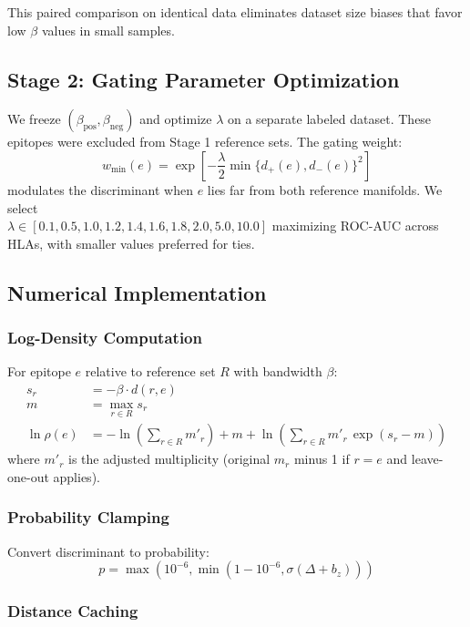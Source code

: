 \documentclass[11pt]{article}
\begin{document}
This paired comparison on identical data eliminates dataset size biases that favor low $\beta$ values in small samples.

\subsection{Stage 2: Gating Parameter Optimization}

We freeze $(\beta_{\mathrm{pos}}, \beta_{\mathrm{neg}})$ and optimize $\lambda$ on a separate labeled dataset. These epitopes were excluded from Stage 1 reference sets. The gating weight:
\[
 w_{\min}(e) = \exp\left[-\frac{\lambda}{2} \min\{d_+(e), d_-(e)\}^2\right]
\]
modulates the discriminant when $e$ lies far from both reference manifolds. We select \\$\lambda \in [0.1, 0.5, 1.0, 1.2, 1.4, 1.6, 1.8, 2.0, 5.0, 10.0]$ maximizing ROC-AUC across HLAs, with smaller values preferred for ties.

\subsection{Numerical Implementation}

\subsubsection{Log-Density Computation}

For epitope $e$ relative to reference set $R$ with bandwidth $\beta$:
\[
\begin{aligned}
 s_r &= -\beta \cdot d(r,e) \\
 m &= \max_{r \in R} s_r \\
 \ln \rho(e) &= -\ln\!\left(\sum_{r \in R} m'_r\right) + m + \ln\!\left(\sum_{r \in R} m'_r \, \exp(s_r - m)\right)
\end{aligned}
\]
where $m'_r$ is the adjusted multiplicity (original $m_r$ minus 1 if $r = e$ and leave-one-out applies).

\subsubsection{Probability Clamping}

Convert discriminant to probability:
\[
 p = \max\left(10^{-6}, \min\left(1-10^{-6}, \sigma(\Delta + b_z)\right)\right)
\]

\subsubsection{Distance Caching}
\end{document}
